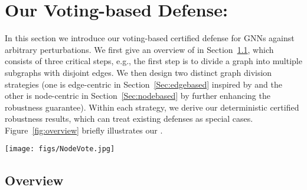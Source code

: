 \section{Our Voting-based Defense: {\name}}
\label{sec:defense}

In this section we introduce our voting-based certified defense {\name} for GNNs against arbitrary perturbations. We first give an overview of {\name} in Section~\ref{Sec:overview}, which consists of three critical steps, e.g., the first step is to divide a graph into multiple subgraphs with disjoint edges. We then 
design two distinct graph division strategies (one is edge-centric in Section~\ref{Sec:edgebased} inspired by \cite{xia2024gnncert} and the other is node-centric in Section~\ref{Sec:nodebased} by further enhancing the robustness guarantee).  
Within each strategy, we derive our deterministic certified robustness results, which can treat existing defenses as special cases. 
Figure~\ref{fig:overview} briefly illustrates our {\name}.

\begin{figure*}[t]
    \centering
    \captionsetup[subfloat]{labelsep=none, format=plain, labelformat=empty}

    \texttt{[image: figs/NodeVote.jpg]}
    \vspace{-2mm}
    \caption{Overview of our {\name} (use node classification for illustration), which consists of three steps. Assume we are given an input graph $G$, a GNN node classifier $f$, and a target node $v$ with label $y_v$ for classification. {\bf Step I:}  it divides $G$ into a set of (e.g., 4) subgraphs via the proposed \emph{Edge-Centric Graph Division} (Section~\ref{Sec:edgebased}) or \emph{Node-Centric Graph Division} (Section~\ref{Sec:nodebased}) strategy. 
    {\bf Step II:} it builds a voting node classifier $\bar{f}$ based on all the subgraphs. Specifically, the target node's predicted class  by $f$ on all subgraphs are treated as votes, and $\bar{f}$ returns the class with the most vote as the final prediction. {\bf Step III:} it derives the certified perturbation size $M$ for $\bar{f}$  against arbitrary perturbations with a deterministic (100\%) guarantee. 
    }
    \label{fig:overview}
    \vspace{-4mm}
\end{figure*}

\vspace{-2mm}
\subsection{Overview}
\label{Sec:overview}

